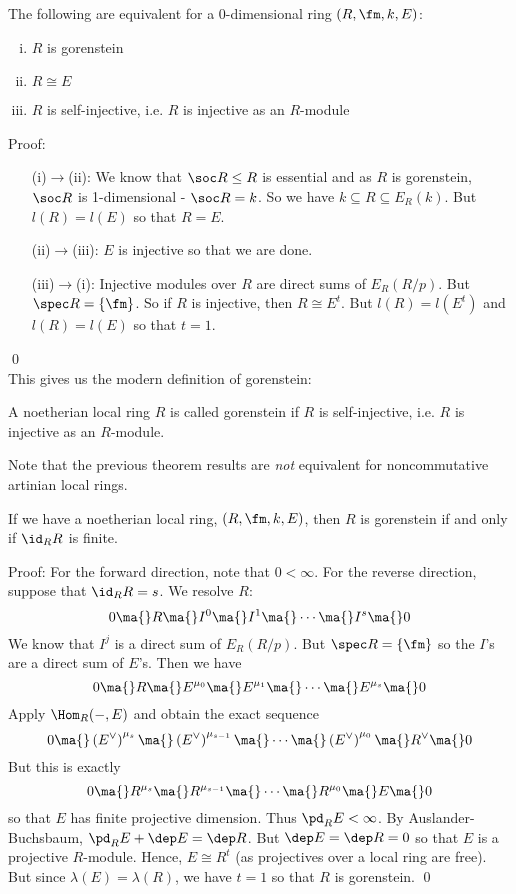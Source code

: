\begin{thmm}
The following are equivalent for a 0-dimensional ring $(R,\fm,k,E)$:
\begin{enumerate}[(i)]
\item $R$ is gorenstein
\item $R \cong E$
\item $R$ is self-injective, i.e. $R$ is injective as an $R$-module
\end{enumerate}
\end{thmm}

\noindent Proof:
\begin{enumerate}
\item[(i)$\to$(ii):] We know that $\soc R \leq R$ is essential and as $R$ is gorenstein, $\soc R$ is 1-dimensional - $\soc R=k$. So we have $k \subseteq R \subseteq E_R(k)$. But $l(R)=l(E)$ so that $R=E$.

\item[(ii)$\to$(iii):] $E$ is injective so that we are done.

\item[(iii)$\to$(i):] Injective modules over $R$ are direct sums of $E_R(R/p)$. But $\spec R=\{\fm\}$. So if $R$ is injective, then $R \cong E^t$. But $l(R)=l(E^t)$ and $l(R)=l(E)$ so that $t=1$. 
\end{enumerate}
\qed \\

This gives us the modern definition of gorenstein:

\begin{dfn}[Gorenstein]
A noetherian local ring $R$ is called gorenstein if $R$ is self-injective, i.e. $R$ is injective as an $R$-module. 
\end{dfn}

Note that the previous theorem results are \emph{not} equivalent for noncommutative artinian local rings.

\begin{cor}
If we have a noetherian local ring, $(R,\fm,k,E)$, then $R$ is gorenstein if and only if $\id_R R$ is finite. 
\end{cor}

\noindent Proof: For the forward direction, note that $0<\infty$. For the reverse direction, suppose that $\id_R R=s$. We resolve $R$:
\[
0 \ma{} R \ma{} I^0 \ma{} I^1 \ma{} \cdots \ma{} I^s \ma{} 0
\]
We know that $I^j$ is a direct sum of $E_R(R/p)$. But $\spec R=\{\fm\}$ so the $I$'s are a direct sum of $E$'s. Then we have
\[
0 \ma{} R \ma{} E^{\mu_0} \ma{} E^{\mu_1} \ma{} \cdots \ma{} E^{\mu_s} \ma{} 0
\]
Apply $\Hom_R(-,E)$ and obtain the exact sequence
\[
0 \ma{} \left(E^\vee\right)^{\mu_s} \ma{} \left(E^\vee\right)^{\mu_{s-1}} \ma{} \cdots \ma{} \left(E^\vee\right)^{\mu_0} \ma{} R^\vee \ma{} 0
\]
But this is exactly
\[
0 \ma{} R^{\mu_s} \ma{} R^{\mu_{s-1}} \ma{} \cdots \ma{} R^{\mu_0} \ma{} E \ma{} 0
\]
so that $E$ has finite projective dimension. Thus $\pd_R E<\infty$. By Auslander-Buchsbaum, $\pd_R E+\dep E=\dep R$. But $\dep E=\dep R=0$ so that $E$ is a projective $R$-module. Hence, $E \cong R^t$ (as projectives over a local ring are free). But since $\lambda(E)=\lambda(R)$, we have $t=1$ so that $R$ is gorenstein. \qed \\

